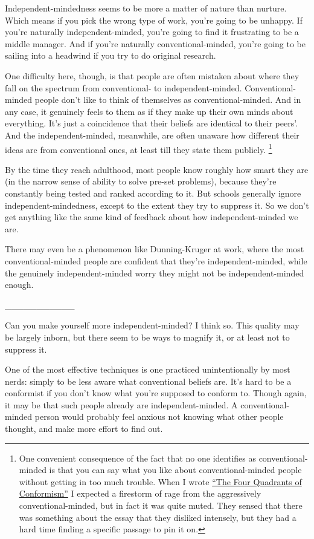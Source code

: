 Independent-mindedness seems to be more a matter of nature than nurture.
Which means if you pick the wrong type of work, you're going to be
unhappy. If you're naturally independent-minded, you're going to find it
frustrating to be a middle manager. And if you're naturally
conventional-minded, you're going to be sailing into a headwind if you
try to do original research.

One difficulty here, though, is that people are often mistaken about
where they fall on the spectrum from conventional- to
independent-minded. Conventional-minded people don't like to think of
themselves as conventional-minded. And in any case, it genuinely feels
to them as if they make up their own minds about everything. It's just a
coincidence that their beliefs are identical to their peers'. And the
independent-minded, meanwhile, are often unaware how different their
ideas are from conventional ones, at least till they state them
publicly. \footnote{One convenient consequence of the fact that no one identifies as
conventional-minded is that you can say what you like about
conventional-minded people without getting in too much trouble. When I
wrote \href{conformism.html}{``The Four Quadrants of Conformism''} I
expected a firestorm of rage from the aggressively conventional-minded,
but in fact it was quite muted. They sensed that there was something
about the essay that they disliked intensely, but they had a hard time
finding a specific passage to pin it on.}

By the time they reach adulthood, most people know roughly how smart
they are (in the narrow sense of ability to solve pre-set problems),
because they're constantly being tested and ranked according to it. But
schools generally ignore independent-mindedness, except to the extent
they try to suppress it. So we don't get anything like the same kind of
feedback about how independent-minded we are.

There may even be a phenomenon like Dunning-Kruger at work, where the
most conventional-minded people are confident that they're
independent-minded, while the genuinely independent-minded worry they
might not be independent-minded enough.

\_\_\_\_\_\_\_\_\_\_\_

Can you make yourself more independent-minded? I think so. This quality
may be largely inborn, but there seem to be ways to magnify it, or at
least not to suppress it.

One of the most effective techniques is one practiced unintentionally by
most nerds: simply to be less aware what conventional beliefs are. It's
hard to be a conformist if you don't know what you're supposed to
conform to. Though again, it may be that such people already are
independent-minded. A conventional-minded person would probably feel
anxious not knowing what other people thought, and make more effort to
find out.


